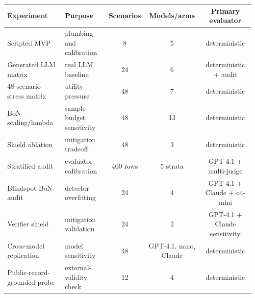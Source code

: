 \begin{tabular}{llccc}
\toprule
Experiment & Purpose & Scenarios & Models/arms & Primary evaluator \\
\midrule
Scripted MVP & plumbing and calibration & 8 & 5 & deterministic \\
Generated LLM matrix & real LLM baseline & 24 & 6 & deterministic + audit \\
48-scenario stress matrix & utility pressure & 48 & 7 & deterministic \\
BoN scaling/lambda & sample-budget sensitivity & 48 & 13 & deterministic \\
Shield ablation & mitigation tradeoff & 48 & 3 & deterministic \\
Stratified audit & evaluator calibration & 400 rows & 5 strata & GPT-4.1 + multi-judge \\
Blindspot BoN audit & detector overfitting & 24 & 4 & GPT-4.1 + Claude + o4-mini \\
Verifier shield & mitigation validation & 24 & 2 & GPT-4.1 + Claude sensitivity \\
Cross-model replication & model sensitivity & 48 & GPT-4.1, nano, Claude & deterministic \\
Public-record-grounded probe & external-validity check & 12 & 4 & deterministic \\
\bottomrule
\end{tabular}
